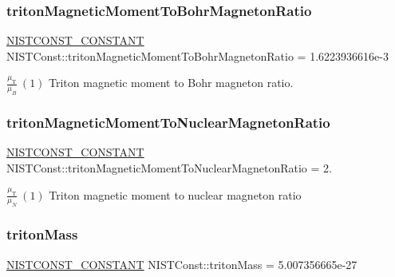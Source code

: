 \subsubsection{\texorpdfstring{triton\+Magnetic\+Moment\+To\+Bohr\+Magneton\+Ratio}{tritonMagneticMomentToBohrMagnetonRatio}}
{\footnotesize\ttfamily \mbox{\hyperlink{_n_i_s_t_const_8hpp_a2b0fc1d7452373f816175dd86ce26729}{N\+I\+S\+T\+C\+O\+N\+S\+T\+\_\+\+C\+O\+N\+S\+T\+A\+NT}} N\+I\+S\+T\+Const\+::triton\+Magnetic\+Moment\+To\+Bohr\+Magneton\+Ratio = 1.\+6223936616e-\/3}

$\frac{\mu_{\textrm{T}}}{\mu_B} \ (1)$ Triton magnetic moment to Bohr magneton ratio. \mbox{\label{group___n_i_s_t_const-_triton_ga84a5453f454af22973152f1be7816ebe}} 
\subsubsection{\texorpdfstring{triton\+Magnetic\+Moment\+To\+Nuclear\+Magneton\+Ratio}{tritonMagneticMomentToNuclearMagnetonRatio}}
{\footnotesize\ttfamily \mbox{\hyperlink{_n_i_s_t_const_8hpp_a2b0fc1d7452373f816175dd86ce26729}{N\+I\+S\+T\+C\+O\+N\+S\+T\+\_\+\+C\+O\+N\+S\+T\+A\+NT}} N\+I\+S\+T\+Const\+::triton\+Magnetic\+Moment\+To\+Nuclear\+Magneton\+Ratio = 2.}

$\frac{\mu_{\textrm{T}}}{\mu_N} \ (1)$ Triton magnetic moment to nuclear magneton ratio \mbox{\label{group___n_i_s_t_const-_triton_ga42de75cc7f68dc31060afe68471d2eba}} 
\subsubsection{\texorpdfstring{triton\+Mass}{tritonMass}}
{\footnotesize\ttfamily \mbox{\hyperlink{_n_i_s_t_const_8hpp_a2b0fc1d7452373f816175dd86ce26729}{N\+I\+S\+T\+C\+O\+N\+S\+T\+\_\+\+C\+O\+N\+S\+T\+A\+NT}} N\+I\+S\+T\+Const\+::triton\+Mass = 5.\+007356665e-\/27}


